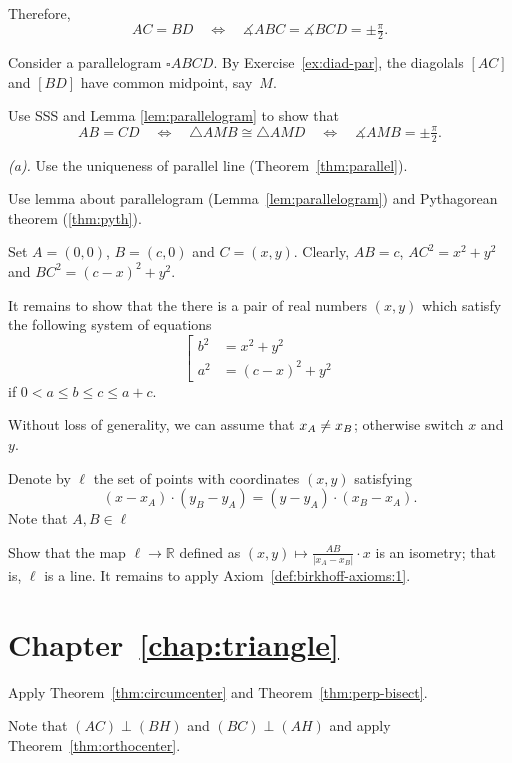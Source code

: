 Therefore, 
\[AC=BD
\quad
\iff
\quad 
\measuredangle ABC
=\measuredangle BCD
=\pm\tfrac\pi2.\]

Consider a parallelogram $\square ABCD$.
By Exercise~\ref{ex:diad-par},
the diagolals $[AC]$ and $[BD]$ have common midpoint, say~$M$.

Use SSS and Lemma \ref{lem:parallelogram} to show that
\[AB=CD
\quad
\iff
\quad
\triangle AMB
\cong
\triangle AMD
\quad
\iff
\quad
\measuredangle AMB
=
\pm\tfrac\pi2.\]

 \textit{(a).} Use the uniqueness of parallel line (Theorem~\ref{thm:parallel}).

 Use lemma about parallelogram (Lemma~\ref{lem:parallelogram}) and Pythagorean theorem (\ref{thm:pyth}).

Set $A=(0,0)$, $B=(c,0)$ and $C=(x,y)$.
Clearly, $AB=c$,
$AC^2=x^2+y^2$ and $BC^2=(c-x)^2+y^2$.

It remains to show that the there is a pair of real numbers $(x,y)$ 
which satisfy the following system of equations 
$$
\left[
\begin{aligned}
b^2&=x^2+y^2
\\
a^2&=(c-x)^2+y^2
\end{aligned}
\right.
$$
if $0<a\le b\le c\le a+c$.
\qeds

Without loss of generality, we can assume that $x_A\z\ne x_B$;
otherwise switch $x$ and~$y$.

Denote by $\ell$ the set of points with coordinates $(x,y)$ satisfying
\[(x-x_A)\cdot (y_B-y_A)=(y-y_A)\cdot (x_B-x_A).\]
Note that $A, B\in \ell$

Show that the map $\ell\to \mathbb{R}$ defined as
$(x,y)\mapsto \tfrac{AB}{|x_A-x_B|}\cdot x$ is an isometry;
that is, $\ell$ is a line.
It remains to apply Axiom~\ref{def:birkhoff-axioms:1}.


\section*{Chapter~\ref{chap:triangle}}
\setcounter{eqtn}{0}

Apply Theorem~\ref{thm:circumcenter} and Theorem~\ref{thm:perp-bisect}.


Note that $(AC)\perp (BH)$ and $(BC)\perp (AH)$ and apply Theorem~\ref{thm:orthocenter}.


